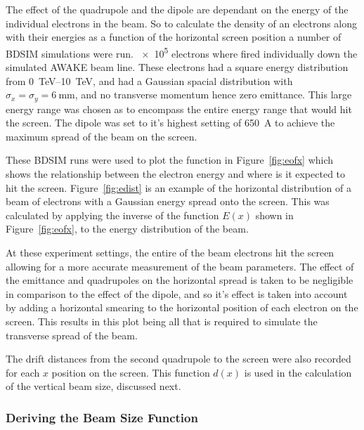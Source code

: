 The effect of the quadrupole and the dipole are dependant on the energy of the
individual electrons in the beam.  So to calculate the density of an electrons
along with their energies as a function of the horizontal screen position a
number of BDSIM simulations were run. \num{e5} electrons where fired
individually down the simulated AWAKE beam line. These electrons had a square
energy distribution from \SIrange{0}{10} {\tera\electronvolt}, and had a
Gaussian spacial distribution with \(\sigma_x = \sigma_y =
\SI{6}{\milli\meter}\), and no transverse momentum hence zero emittance. This
large energy range was chosen as to encompass the entire energy range that would
hit the screen. The dipole was set to it's highest setting of \SI{650}{\ampere}
to achieve the maximum spread of the beam on the screen.

These BDSIM runs were used to plot the function in Figure~\ref{fig:eofx} which
shows the relationship between the electron energy and where is it expected to
hit the screen. Figure~\ref{fig:edist} is an example of the horizontal
distribution of a beam of electrons with a Gaussian energy spread onto the
screen. This was calculated by applying the inverse of the function \(E(x)\)
shown in Figure~\ref{fig:eofx}, to the energy distribution of the beam.

At these experiment settings, the entire of the beam electrons hit the screen
allowing for a more accurate measurement of the beam parameters.  The effect of
the emittance and quadrupoles on the horizontal spread is taken to be negligible
in comparison to the effect of the dipole, and so it's effect is taken into
account by adding a horizontal smearing to the horizontal position of each
electron on the screen. This results in this plot being all that is required to
simulate the transverse spread of the beam.

The drift distances from the second quadrupole to the screen were also recorded
for each \(x\) position on the screen. This function \(d(x)\) is used in the
calculation of the vertical beam size, discussed next.


\subsubsection{Deriving the Beam Size Function}


